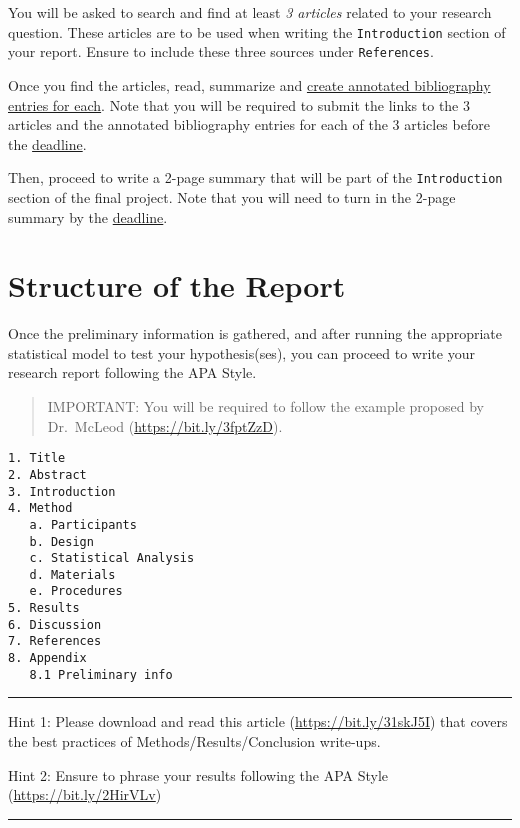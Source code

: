 \documentclass[
]{article}
\begin{document}
You will be asked to search and find at least \emph{3 articles} related to your research question. These articles are to be used when writing the \texttt{Introduction} section of your report. Ensure to include these three sources under \texttt{References}.

Once you find the articles, read, summarize and \href{https://bit.ly/2YIGK2t}{create annotated bibliography entries for each}. Note that you will be required to submit the links to the 3 articles and the annotated bibliography entries for each of the 3 articles before the \protect\hyperlink{deadlines}{deadline}.

Then, proceed to write a 2-page summary that will be part of the \texttt{Introduction} section of the final project. Note that you will need to turn in the 2-page summary by the \protect\hyperlink{deadlines}{deadline}.

\hypertarget{structure-of-the-report}{%
\section{Structure of the Report}\label{structure-of-the-report}}

Once the preliminary information is gathered, and after running the appropriate statistical model to test your hypothesis(ses), you can proceed to write your research report following the APA Style.

\begin{quote}
IMPORTANT: You will be required to follow the example proposed by Dr.~McLeod (\url{https://bit.ly/3fptZzD}).
\end{quote}

\begin{verbatim}
1. Title
2. Abstract
3. Introduction
4. Method
   a. Participants
   b. Design
   c. Statistical Analysis
   d. Materials
   e. Procedures
5. Results
6. Discussion
7. References
8. Appendix
   8.1 Preliminary info
\end{verbatim}

\begin{center}\rule{0.5\linewidth}{0.5pt}\end{center}

Hint 1: Please download and read this article (\url{https://bit.ly/31skJ5I}) that covers the best practices of Methods/Results/Conclusion write-ups.

Hint 2: Ensure to phrase your results following the APA Style (\url{https://bit.ly/2HirVLv})

\begin{center}\rule{0.5\linewidth}{0.5pt}\end{center}
\end{document}
